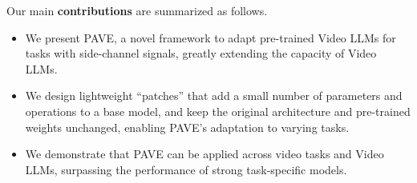 
\medskip
Our main \textbf{contributions} are summarized as follows.
\begin{itemize}
    \item We present PAVE, a novel framework to adapt pre-trained Video LLMs for tasks with side-channel signals, greatly extending the capacity of Video LLMs.
    \item We design lightweight ``patches'' that add a small number of parameters and operations to a base model, and keep the original architecture and pre-trained weights unchanged, enabling PAVE's adaptation to varying tasks. 
    \item We demonstrate that PAVE can be applied across video tasks and Video LLMs, surpassing the performance of strong task-specific models. %
\end{itemize}

